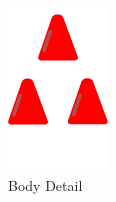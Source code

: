 \begin{figure}[!h]
%
  \includegraphics[width=\linewidth]{chapters/modding/fleetBody.png}
  \caption*{Body Detail}
\endminipage\hfill
{}%

\end{figure}
